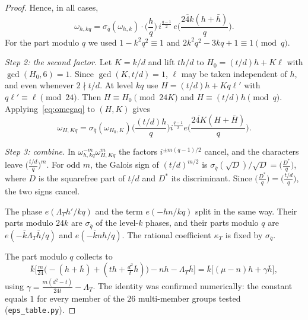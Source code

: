 \documentclass[11pt]{amsart}
\theoremstyle{definition}\newtheorem{definition}[theorem]{Definition}
\theoremstyle{remark}\newtheorem{remark}[theorem]{Remark}
\begin{document}
\begin{proof}
Hence, in all cases,
\begin{equation}\label{eq:omegaq}
\omega_{h,kq}=\sigma_{\bar q}(\omega_{h,k})\cdot\Big(\frac hq\Big)\,i^{\frac{q-1}2}\,e\Big(\frac{\overline{24k}(h+\bar h)}{q}\Big).
\end{equation}
For the part modulo $q$ we used $1-k^2q^2\equiv1$ and $2k^2q^2-3kq+1\equiv1\pmod q$.

\emph{Step 2: the second factor.} Let $K=k/d$ and lift $th/d$ to $H_0=(t/d)h+K\ell$ with $\gcd(H_0,6)=1$. Since $\gcd(K,t/d)=1$, $\ell$ may be taken independent of $h$, and even whenever $2\nmid t/d$. At level $kq$ use $H=(t/d)h+Kq\ell'$ with $q\ell'\equiv\ell\pmod{24}$. Then $H\equiv H_0\pmod{24K}$ and $H\equiv(t/d)h\pmod q$. Applying~\eqref{eq:omegaq} to $(H,K)$ gives
\[
\omega_{H,Kq}=\sigma_{\bar q}(\omega_{H_0,K})\Big(\frac{(t/d)h}{q}\Big)i^{\frac{q-1}2}e\Big(\frac{\overline{24K}(H+\bar H)}{q}\Big).
\]

\emph{Step 3: combine.} In $\omega_{h,kq}^{-m}\omega_{H,Kq}^{m}$ the factors $i^{\pm m(q-1)/2}$ cancel, and the characters leave $\big(\frac{t/d}q\big)^m$. For odd $m$, the Galois sign of $(t/d)^{m/2}$ is $\sigma_{\bar q}(\sqrt{D})/\sqrt D=\big(\frac{D^\ast}{q}\big)$, where $D$ is the squarefree part of $t/d$ and $D^\ast$ its discriminant. Since $\big(\frac{D^\ast}q\big)=\big(\frac{t/d}q\big)$, the two signs cancel.

The phase $e(\Lambda_Th'/kq)$ and the term $e(-hn/kq)$ split in the same way. Their parts modulo $24k$ are $\sigma_{\bar q}$ of the level-$k$ phases, and their parts modulo $q$ are $e(-\bar k\Lambda_T\bar h/q)$ and $e(-\bar knh/q)$. The rational coefficient $\kappa_T$ is fixed by $\sigma_{\bar q}$.

The part modulo $q$ collects to
\[
\bar k\Big[\tfrac{m}{24}\big(-(h+\bar h)+(t h+\tfrac{d^2}t\bar h)\big)-nh-\Lambda_T\bar h\Big]=\bar k\big[(\mu-n)h+\gamma\bar h\big],
\]
using $\gamma=\frac{m(d^2-t)}{24t}-\Lambda_T$. The identity was confirmed numerically: the constant equals $1$ for every member of the $26$ multi-member groups tested (\texttt{eps\_table.py}).
\end{proof}
\end{document}

